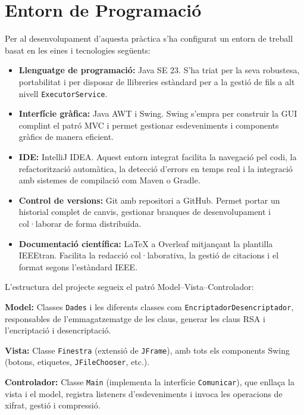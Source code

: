 \documentclass{ieeetj}
\begin{document}
\section{Entorn de Programació}
Per al desenvolupament d’aquesta pràctica s’ha configurat un entorn de treball basat en les eines i tecnologies següents:

\begin{itemize}
  \item \textbf{Llenguatge de programació:} Java SE 23. S’ha triat per la seva robustesa, portabilitat i per disposar de llibreries estàndard per a la gestió de fils a alt nivell \texttt{ExecutorService}.
  \item \textbf{Interfície gràfica:} Java AWT i Swing. Swing s’empra per construir la GUI complint el patró MVC\cite{gamma1994} i permet gestionar esdeveniments i components gràfics de manera eficient\cite{gafter1999}.
  \item \textbf{IDE:} IntelliJ IDEA. Aquest entorn integrat facilita la navegació pel codi, la refactorització automàtica, la detecció d’errors en temps real i la integració amb sistemes de compilació com Maven o Gradle.
  \item \textbf{Control de versions:} Git amb repositori a GitHub. Permet portar un historial complet de canvis, gestionar branques de desenvolupament i col·laborar de forma distribuïda.
  \item \textbf{Documentació científica:} LaTeX a Overleaf mitjançant la plantilla IEEEtran. Facilita la redacció col·laborativa, la gestió de citacions i el format segons l’estàndard IEEE.
\end{itemize}

\noindent
L’estructura del projecte segueix el patró Model–Vista–Controlador:
\begin{description}
  \item\textbf{Model:} Classes \texttt{Dades} i les diferents classes com \texttt{EncriptadorDesencriptador}, responsables de l’emmagatzematge de les claus, generar les claus RSA i l'encriptació i desencriptació.
  
  \item\textbf{Vista:} Classe \texttt{Finestra} (extensió de \texttt{JFrame}), amb tots els components Swing (botons, etiquetes, \texttt{JFileChooser}, etc.).
  \item\textbf{Controlador:} Classe \texttt{Main} (implementa la interfície \texttt{Comunicar}), que enllaça la vista i el model, registra listeners d’esdeveniments i invoca les operacions de xifrat, gestió i compressió.
\end{description}
\end{document}
